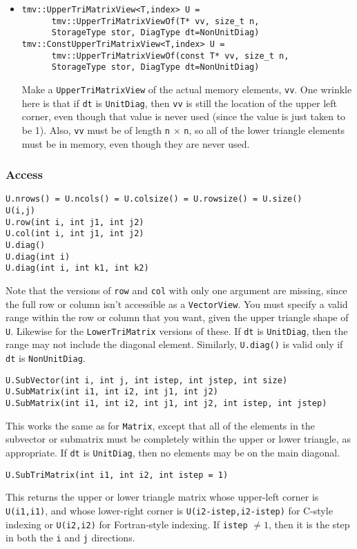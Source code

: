 \documentclass[twoside,letterpaper,11pt]{article}
\renewcommand{\tt}[1]{{\texttt {#1}}}
\begin{document}
\begin{itemize}
\item
\begin{verbatim}
tmv::UpperTriMatrixView<T,index> U = 
      tmv::UpperTriMatrixViewOf(T* vv, size_t n, 
      StorageType stor, DiagType dt=NonUnitDiag)
tmv::ConstUpperTriMatrixView<T,index> U = 
      tmv::UpperTriMatrixViewOf(const T* vv, size_t n, 
      StorageType stor, DiagType dt=NonUnitDiag)
\end{verbatim}
Make a \tt{UpperTriMatrixView} of the actual memory elements, \tt{vv}.
One wrinkle here is that if \tt{dt} is \tt{UnitDiag}, then 
\tt{vv} is still the location of the
upper left corner, even though that value is never used 
(since the value is just taken to
be 1).  Also, \tt{vv} must be of length \tt{n} $\times$ \tt{n},
so all of the lower triangle
elements must be in memory, even though they are never used.

\end{itemize}

\subsubsection{Access}

\begin{verbatim}
U.nrows() = U.ncols() = U.colsize() = U.rowsize() = U.size()
U(i,j)
U.row(int i, int j1, int j2)
U.col(int i, int j1, int j2)
U.diag()
U.diag(int i)
U.diag(int i, int k1, int k2)
\end{verbatim}
Note that the versions of \tt{row} and \tt{col} with only one argument are
missing, since the full row or column isn't accessible as a \tt{VectorView}.
You must specify a valid range within the row or column that you want, 
given the upper triangle shape of \tt{U}.  Likewise for the \tt{LowerTriMatrix}
versions of these.
If \tt{dt} is \tt{UnitDiag}, then the range may not include the diagonal element.
Similarly, \tt{U.diag()} is valid only if \tt{dt} is \tt{NonUnitDiag}.

\begin{verbatim}
U.SubVector(int i, int j, int istep, int jstep, int size)
U.SubMatrix(int i1, int i2, int j1, int j2)
U.SubMatrix(int i1, int i2, int j1, int j2, int istep, int jstep)
\end{verbatim}
This works the same as for \tt{Matrix}, except that all of the elements in the 
subvector or submatrix must be completely within the upper or lower triangle, as
appropriate.  If \tt{dt} is \tt{UnitDiag}, then no elements may be on the 
main diagonal.

\begin{verbatim}
U.SubTriMatrix(int i1, int i2, int istep = 1)
\end{verbatim}
This returns the upper or lower triangle matrix whose upper-left
corner is \tt{U(i1,i1)}, and whose lower-right corner is 
\tt{U(i2-istep,i2-istep)} for C-style indexing or \tt{U(i2,i2)} 
for Fortran-style indexing.  If \tt{istep} $\neq 1$, then it is the 
step in both the \tt{i} and \tt{j} directions.
\end{document}
